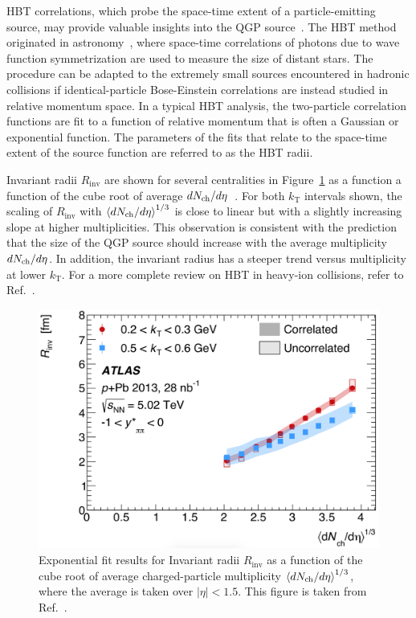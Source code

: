 HBT correlations, which probe the space-time extent of a particle-emitting source, may provide valuable insights into the QGP source~\cite{Aaboud:2017xpw}. The HBT method originated in astronomy~\cite{HanburyBrown:1956bqd}, where space-time correlations of photons due to wave function symmetrization are used to measure the size of distant stars. The procedure can be adapted to the extremely small sources encountered in hadronic collisions if identical-particle Bose-Einstein correlations are instead studied in relative momentum space. In a typical HBT analysis, the two-particle correlation functions are fit to a function of relative momentum that is often a Gaussian or exponential function. The parameters of the fits that relate to the space-time extent of the source function are referred to as the HBT radii.

Invariant radii $R_\text{inv}$ are shown for several centralities in Figure~\ref{fig:intro_HBT_ATLAS} as a function a function of the cube root of average $dN_\text{ch} / d\eta$~\cite{Aaboud:2017xpw}. For both $k_\text{T}$ intervals shown, the scaling of $R_\text{inv}$ with $\left\langle dN_\text{ch} / d\eta\right\rangle^{1/3}$ is close to linear but with a slightly increasing slope at higher multiplicities. This observation is consistent with the prediction that the size of the QGP source should increase with the average multiplicity $dN_\text{ch} / d\eta$. In addition, the invariant radius has a steeper trend versus multiplicity at lower $k_\text{T}$. For a more complete review on HBT in heavy-ion collisions, refer to Ref.~\cite{Lisa:2005dd}.

\begin{figure}[H]
\centering
\includegraphics[width=.6\linewidth]{figs/chapter_intro/HBT_ATLAS.png}
\caption{Exponential fit results for Invariant radii $R_\text{inv}$ as a function of the cube root of average charged-particle multiplicity $\left\langle dN_\text{ch} / d\eta\right\rangle^{1/3}$, where the average is taken over $|\eta|<1.5$. This figure is taken from Ref.~\cite{Aaboud:2017xpw}.}
\label{fig:intro_HBT_ATLAS}
\end{figure}



